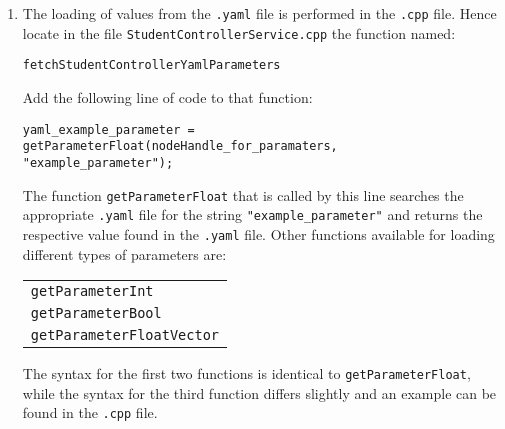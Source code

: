 \documentclass[]{report}
\newcommand{\cppfile}{StudentControllerService.cpp}
\newcommand{\loadyamlfunction}{fetchStudentControllerYamlParameters}
\begin{document}
\begin{enumerate}[topsep=-1pt , itemsep=1pt ,  label = \textbf{(\arabic{*})} ]
		\item The loading of values from the \texttt{.yaml} file is performed in the \texttt{.cpp} file. Hence locate in the file \texttt{\cppfile} the function named:
		\begin{center}
			\large{\texttt{\loadyamlfunction}}
		\end{center}
		Add the following line of code to that function:
		\begin{flushleft}
			\large{\texttt{yaml\_example\_parameter =}}
			\\
			\hspace{0.8cm}\large{\texttt{getParameterFloat(nodeHandle\_for\_paramaters,}}
			\\
			\hspace{0.8cm}\large{\texttt{"example\_parameter");}}
		\end{flushleft}
		The function \texttt{getParameterFloat} that is called by this line searches the appropriate \texttt{.yaml} file for the string \texttt{"example\_parameter"} and returns the respective value found in the \texttt{.yaml} file. Other functions available for loading different types of parameters are:
		\begin{center}
			\begin{tabular}{l}
				\large{\texttt{getParameterInt}}
				\\
				\large{\texttt{getParameterBool}}
				\\
				\large{\texttt{getParameterFloatVector}}
			\end{tabular}
		\end{center}
		The syntax for the first two functions is identical to \texttt{getParameterFloat}, while the syntax for the third function differs slightly and an example can be found in the \texttt{.cpp} file.
		
	\end{enumerate}
	
\end{document}
